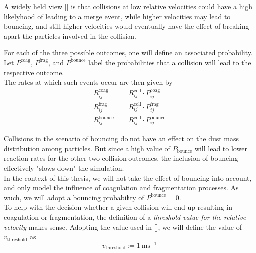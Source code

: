         A widely held view [] is that collisions at low relative velocities could have 
        a high likelyhood of leading to a merge event, while higher velocities may lead to 
        bouncing, and still higher velocities would eventually have the effect 
        of breaking apart the particles involved in the collision. \\

        

        \clearpage

        For each of the three possible outcomes, one will define an associated probability. \\
        Let $P^\text{coag}$, $P^\text{frag}$, and $P^\text{bounce}$
        label the probabilities that a collision will lead to the respective outcome. \\

        The rates at which such events occur are then given by
        \begin{align}
            R^\text{coag}_{ij}   &= R^\text{coll}_{ij} \cdot P^\text{coag}_{ij} \\
            R^\text{frag}_{ij}   &= R^\text{coll}_{ij} \cdot P^\text{frag}_{ij} \\
            R^\text{bounce}_{ij} &= R^\text{coll}_{ij} \cdot P^\text{bounce}_{ij}
        \end{align}

        Collisions in the scenario of bouncing do not have an effect on the dust mass distribution
        among particles. But since a high value of $P_\text{bounce}$ will lead to lower reaction 
        rates for the other two collision outcomes, the inclusion of bouncing effectively 
        "slows down" the simulation. \\

        In the context of this thesis, we will not take the effect of bouncing into account, and 
        only model the influence of coagulation and fragmentation processes. As wuch, we will adopt 
        a bouncing probability of $P^\text{bounce}=0$. \\

        To help with the decision whether a given collision will end up resulting in 
        coagulation or fragmentation, the definition of a
        \textit{threshold value for the relative velocity} makes sense.
        Adopting the value used in [],
        we will define the value of $v_\text{threshold}$ as
        \begin{equation}
            v_\text{threshold} := \SI{1}{\meter\second^{-1}}
        \end{equation}

